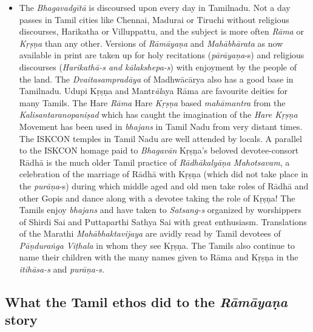 \begin{itemize}
\item The \textit{Bhagavadgītā} is discoursed upon every day in Tamilnadu. Not a day passes in Tamil cities like Chennai, Madurai or Tiruchi without religious discourses, Harikatha or Villuppattu, and the subject is more often \textit{Rāma} or \textit{Kṛṣṇa} than any other. Versions of \textit{Rāmāyaṇa} and \textit{Mahābhārata} as now available in print are taken up for holy recitations (\textit{pārāyaṇa}-s) and religious discourses (\textit{Harikathā-s and kālakshepa-s}) with enjoyment by the people of the land. The \textit{Dvaitasampradāya} of Madhwācārya also has a good base in Tamilnadu. Udupi Kṛṣṇa and Mantr\textit{āl}aya Rāma are favourite deities for many Tamils. The Hare \textit{Rāma} Hare \textit{Kṛṣṇa} based \textit{mahāmantra} from the \textit{Kalisantaranopaniṣad} which has caught the imagination of the \textit{Hare Kṛṣṇa} Movement has been used in \textit{bhajans} in Tamil Nadu from very distant times. The ISKCON temples in Tamil Nadu are well attended by locals. A parallel to the ISKCON homage paid to \textit{Bhagavān} Kṛṣṇa’s beloved devotee-consort Rādhā is the much older Tamil practice of \textit{Rādhākalyāṇa Mahotsavam}, a celebration of the marriage of Rādhā with Kṛṣṇa (which did not take place in the \textit{purāņa}-s) during which middle aged and old men take roles of Rādhā and other Gopis and dance along with a devotee taking the role of Kṛṣṇa! The Tamils enjoy \textit{bhajans} and have taken to \textit{Satsang-s} organized by worshippers of Shirdi Sai and Puttaparthi Sathya Sai with great enthusiasm. Translations of the Marathi \textit{Mahābhaktavijaya} are avidly read by Tamil devotees of \textit{Pāṇduraṅga Viṭhala} in whom they see Kṛṣṇa. The Tamils also continue to name their children with the many names given to Rāma and Kṛṣṇa in the \textit{itihāsa-s} and \textit{purāṇa-s.}

\end{itemize}

\newpage

\subsection*{What the Tamil ethos did to the \textit{Rāmāyaṇa} story}


